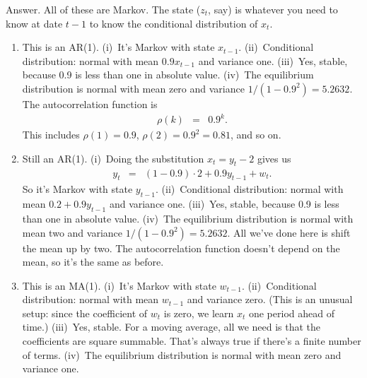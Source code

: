 \documentclass[11pt]{article}
\begin{document}
\begin{enumerate}
Answer.
All of these are Markov.
The state ($z_t$, say) is whatever you need to know at date $t-1$ to
know the conditional distribution of $x_t$.
\begin{enumerate}
\item This is an AR(1).
(i)~It's Markov with state $x_{t-1}$.
(ii)~Conditional distribution:  normal with mean $0.9 x_{t-1}$ and variance one.
(iii)~Yes, stable, because 0.9 is less than one in absolute value.
(iv)~The equilibrium distribution is normal with mean zero and variance
$1/(1-0.9^2) = 5.2632$.
The autocorrelation function is
\begin{eqnarray*}
    \rho(k) &=& 0.9^k .
\end{eqnarray*}
This includes $\rho(1) = 0.9$, $\rho(2) = 0.9^2 = 0.81$, and so on.

\item Still an AR(1).
(i)~Doing the substitution $x_t = y_t - 2$ gives us
\begin{eqnarray*}
    y_t &=& (1-0.9) \cdot 2 + 0.9 y_{t-1} + w_t .
\end{eqnarray*}
So it's Markov with state $y_{t-1}$.
(ii)~Conditional distribution:  normal with mean $0.2 + 0.9 y_{t-1}$ and variance one.
(iii)~Yes, stable, because 0.9 is less than one in absolute value.
(iv)~The equilibrium distribution is normal with mean two and variance
$1/(1-0.9^2) = 5.2632$.
All we've done here is shift the mean up by two.
The autocorrelation function doesn't depend on the mean, so it's the same
as before.

\item This is an MA(1).
(i)~It's Markov with state $w_{t-1}$.
(ii)~Conditional distribution:  normal with mean $w_{t-1}$ and variance zero.
(This is an unusual setup:  since the coefficient of $w_t$ is zero,
we learn $x_t$ one period ahead of time.)
(iii)~Yes, stable.  For a moving average, all we need is that
the coefficients are square summable.
That's always true if there's a finite number of terms.
(iv)~The equilibrium distribution is normal with mean zero and variance one.


\end{enumerate}
\end{enumerate}
\end{document}
